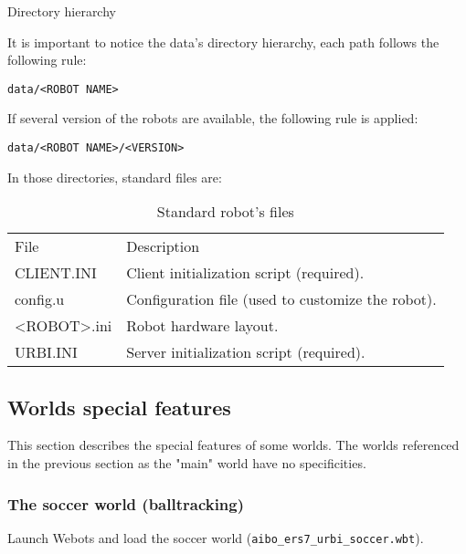 \begin{table}[htbp]
\caption{Directory hierarchy}
\label{webots.builtin.directory}%
\end{table}

 It is important to notice the data's directory hierarchy, each path follows
the following rule:


\begin{lstlisting}[firstnumber=1,]
data/<ROBOT NAME>
\end{lstlisting}

If several version of the robots are available, the following
rule is applied:

\begin{lstlisting}[firstnumber=1,]
data/<ROBOT NAME>/<VERSION>
\end{lstlisting}

 In those directories, standard files are:

\begin{table}[htbp]
\begin{center}
\begin{tabular}{ll}\hline
  File &        Description \\
  CLIENT.INI &  Client initialization script (required). \\
  config.u &    Configuration file (used to customize the robot). \\
  <ROBOT>.ini & Robot hardware layout. \\
  URBI.INI &    Server initialization script (required). \\
\hline
\end{tabular}
\end{center}

\caption{Standard robot's files}
\label{webots.builtin.files}%
\end{table}

\subsection{Worlds special features}
\label{webots.builtin.worlds}%

 This section describes the special features of some worlds.
The worlds referenced in the previous section as the "main"
world have no specificities.


\subsubsection{The soccer world (balltracking)}
\label{webots.builtin.worlds.soccer}%

 Launch Webots and load the soccer world
(\nolinkurl{aibo_ers7_urbi_soccer.wbt}).



